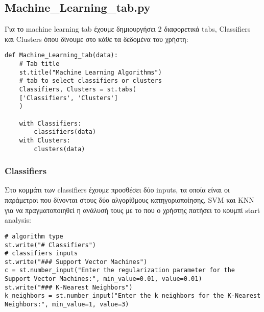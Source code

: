 \documentclass[a4paper,12pt]{article}
\begin{document}
\newpage


\subsection{Machine\_Learning\_tab.py}  
Για το machine learning tab έχουμε δημιουργήσει 2 διαφορετικά tabs, Classifiers και Clusters όπου δίνουμε στο κάθε τα δεδομένα του χρήστη:

\begin{lstlisting}
def Machine_Learning_tab(data):
    # Tab title
    st.title("Machine Learning Algorithms")
    # tab to select classifiers or clusters 
    Classifiers, Clusters = st.tabs(
    ['Classifiers', 'Clusters']
    )
    
    with Classifiers:
        classifiers(data)
    with Clusters:
        clusters(data)
\end{lstlisting}

\subsubsection{Classifiers}
Στο κομμάτι των classifiers έχουμε προσθέσει δύο inputs, τα οποία είναι οι παράμετροι που δίνονται στους δύο αλγορίθμους κατηγοριοποίησης, SVM και KNN για να πραγματοποιηθεί η ανάλυσή τους με το που ο χρήστης πατήσει το κουμπί start analysis:

\begin{lstlisting}
# algorithm type
st.write("# Classifiers")
# classifiers inputs
st.write("### Support Vector Machines")
c = st.number_input("Enter the regularization parameter for the Support Vector Machines:", min_value=0.01, value=0.01)
st.write("### K-Nearest Neighbors")
k_neighbors = st.number_input("Enter the k neighbors for the K-Nearest Neighbors:", min_value=1, value=3)
\end{lstlisting}


\newpage
\end{document}

